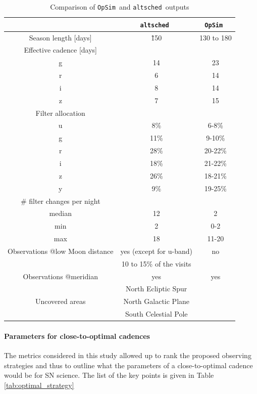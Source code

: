 \documentclass[a4paper,10pt]{article}
\newcommand{\opsim}{{\tt OpSim\ }}
\newcommand{\altsched}{{\tt altsched\ }}
\begin{document}
\begin{table}[!htbp]
  \begin{center}
    \caption{Comparison of \opsim and \altsched outputs}\label{tab:opsim_vs_altsched}
\begin{tabular}{c|c|c}
  \hline
  \hline
 & \altsched & \opsim \\
 \hline
 Season length [days] & \~ 150 & 130 to 180 \\
 \hline
 Effective cadence [days]   &        & \\
 				           g &  14  & 23 \\
 				           r &   6  & 14 \\
						   i &   8  & 14 \\
						   z &   7  & 15 \\
 \hline
 Filter allocation 			&  & \\
 				            u & 8\% & 6-8\% \\
 					  		g &  11\% & 9-10\% \\
 				           r &   28\%  & 20-22\% \\
						   i &   18\%  & 21-22\%\\
						   z &   26\%  & 18-21\% \\
						   y &   9\%  & 19-25\% \\
 \hline
 \# filter changes per night      & & \\
 				          median & 12 & 2 \\ 
 				          min    & 2 & 0-2\\
 				          max    & 18 & 11-20 \\
 \hline
 Observations @low Moon distance & yes (except for u-band)& no \\
                                 & 10 to 15\% of the visits & \\
 \hline
 Observations @meridian          & yes    & yes \\
 \hline
 				               & North Ecliptic Spur & \\
 Uncovered areas 			& North Galactic Plane & \\
 							     & South Celestial Pole &  \\
 \hline
 \end{tabular}
\end{center}
\end{table}

\paragraph{Parameters for close-to-optimal cadences} The metrics considered in this study allowed up to rank the proposed observing strategies and thus to outline what the parameters of a close-to-optimal cadence would be for SN science. The list of the key points is given in Table \ref{tab:optimal_strategy}
\end{document}
